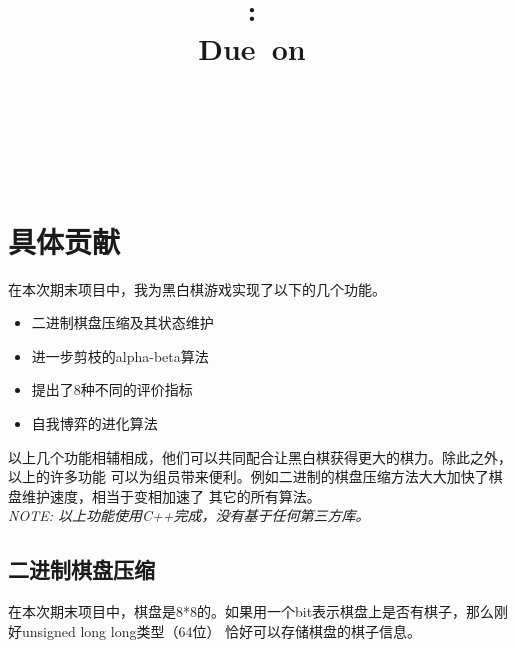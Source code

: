 \documentclass[a4paper]{article}
\title{
\vspace{2in}
\textmd{\textbf{\hmwkClass:\ \hmwkTitle}}\\
\normalsize\vspace{0.1in}\small{Due\ on\ \hmwkDueDate}\\
\vspace{0.1in}\large{\textit{\hmwkClassInstructor\ \hmwkClassTime}}
\vspace{3in}
}
\author{\textbf{\LARGE{\hmwkAuthorName}} \\ \\ \textbf{\LARGE{\hmwkAuthorId}}}
\date{} %
\begin{document}

\maketitle




\renewcommand{\contentsname}{Content} %
\newpage
\tableofcontents
{}
\newpage



\section{具体贡献}
在本次期末项目中，我为黑白棋游戏实现了以下的几个功能。
\begin{itemize}
    \item 二进制棋盘压缩及其状态维护
    \item 进一步剪枝的alpha-beta算法
    \item 提出了8种不同的评价指标
    \item 自我博弈的进化算法
\end{itemize}
以上几个功能相辅相成，他们可以共同配合让黑白棋获得更大的棋力。除此之外，以上的许多功能
可以为组员带来便利。例如二进制的棋盘压缩方法大大加快了棋盘维护速度，相当于变相加速了
其它的所有算法。\\

\emph{NOTE: 以上功能使用C++完成，没有基于任何第三方库。}
\subsection{二进制棋盘压缩}
在本次期末项目中，棋盘是8*8的。如果用一个bit表示棋盘上是否有棋子，那么刚好unsigned long long类型（64位）
恰好可以存储棋盘的棋子信息。\\
\end{document}

